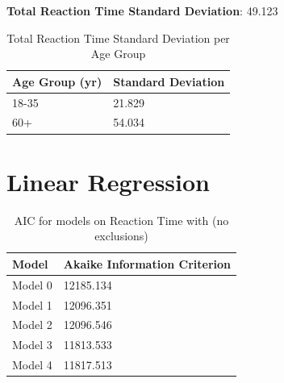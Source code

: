 \documentclass[12pt,twoside]{reedthesis}
\begin{document}
\textbf{Total Reaction Time Standard Deviation}: 49.123

\begin{table}[h!]
    \centering
    \begin{tabular}{| p{3.5cm} | p{3.5cm} |}
        \hline
        Age Group (yr) & Standard Deviation\\
        \hline
        18-35 & 21.829\\
        \hline
        60+ & 54.034\\
        \hline
    \end{tabular}
    \caption{Total Reaction Time Standard Deviation per Age Group}
\end{table}







\chapter{Linear Regression}\label{c}

\begin{table}[h!]
        \centering
        \begin{tabular}{| p{3.5cm} | p{7.5cm} |}
            \hline
            Model & Akaike Information Criterion\\
            \hline
            Model 0 & 12185.134\\
            \hline
            Model 1 & 12096.351\\
            \hline
            Model 2 & 12096.546\\
            \hline
            Model 3 & 11813.533\\
            \hline
            Model 4 & 11817.513\\
            \hline
        \end{tabular}
        \caption{AIC for models on Reaction Time with (no exclusions)}
    \end{table}
\end{document}
